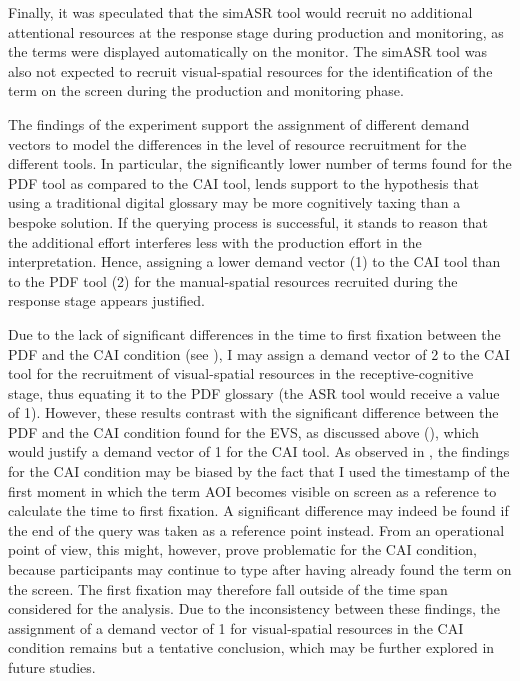 Finally, it was speculated that the simASR tool would recruit no additional attentional resources at the response stage during production and monitoring, as the terms were displayed automatically on the monitor. The simASR tool was also not expected to recruit visual-spatial resources for the identification of the term on the screen during the production and monitoring phase.

The findings of the experiment support the assignment of different demand vectors to model the differences in the level of resource recruitment for the different tools. In particular, the significantly lower number of terms found for the PDF tool as compared to the CAI tool, lends support to the hypothesis that using a traditional digital glossary may be more cognitively taxing than a bespoke solution. If the querying process is successful, it stands to reason that the additional effort interferes less with the production effort in the interpretation. Hence, assigning a lower demand vector (1) to the CAI tool than to the PDF tool (2) for the manual-spatial resources recruited during the response stage appears justified.

Due to the lack of significant differences in the time to first fixation between the PDF and the CAI condition (see ), I may assign a demand vector of 2 to the CAI tool for the recruitment of visual-spatial resources in the receptive-cognitive stage, thus equating it to the PDF glossary (the ASR tool would receive a value of 1). However, these results contrast with the significant difference between the PDF and the CAI condition found for the EVS, as discussed above (), which would justify a demand vector of 1 for the CAI tool. As observed in , the findings for the CAI condition may be biased by the fact that I used the timestamp of the first moment in which the term AOI becomes visible on screen as a reference to calculate the time to first fixation. A significant difference may indeed be found if the end of the query was taken as a reference point instead. From an operational point of view, this might, however, prove problematic for the CAI condition, because participants may continue to type after having already found the term on the screen. The first fixation may therefore fall outside of the time span considered for the analysis. Due to the inconsistency between these findings, the assignment of a demand vector of 1 for visual-spatial resources in the CAI condition remains but a tentative conclusion, which may be further explored in future studies.\largerpage


